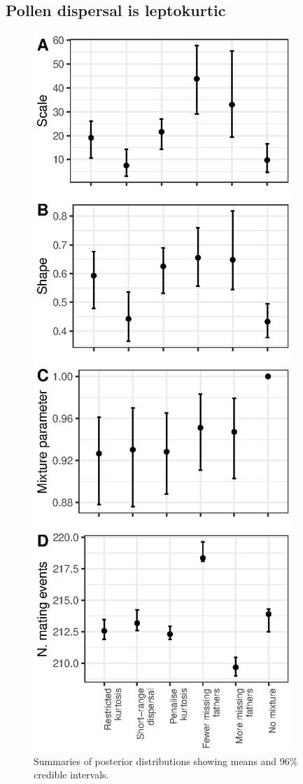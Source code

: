 \documentclass[10pt, a4paper, twocolumn]{article} %
\begin{document}
\subsection{Pollen dispersal is leptokurtic}

\begin{figure}
\includegraphics{posterior_distributions.eps}
\caption{Summaries of posterior distributions showing means and 96\% credible intervals.}
\label{fig:posterior_summaries}
\end{figure}
\end{document}
